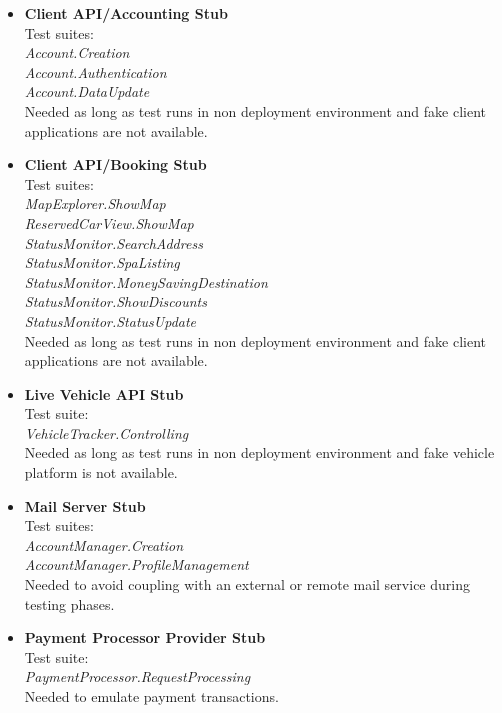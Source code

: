  \begin{itemize}

    \item \textbf{Client API/Accounting Stub}\\
        Test suites:\\\textit{Account.Creation\\
Account.Authentication\\Account.DataUpdate\\}
        Needed as long as test runs in non deployment environment and fake client applications are not available.
    \item \textbf{Client API/Booking Stub}\\
        Test suites:\\\textit{MapExplorer.ShowMap\\ReservedCarView.ShowMap\\StatusMonitor.SearchAddress\\StatusMonitor.SpaListing\\StatusMonitor.MoneySavingDestination\\StatusMonitor.ShowDiscounts\\StatusMonitor.StatusUpdate\\}
        Needed as long as test runs in non deployment environment and fake client applications are not available.
    \item \textbf{Live Vehicle API Stub}\\
        Test suite:\\\textit{VehicleTracker.Controlling\\}
        Needed as long as test runs in non deployment environment and fake vehicle platform is not available.
    \item \textbf{Mail Server Stub}\\
        Test suites:\\\textit{AccountManager.Creation\\AccountManager.ProfileManagement\\}
        Needed to avoid coupling with an external or remote mail service during testing phases.
    \item \textbf{Payment Processor Provider Stub}\\
        Test suite:\\\textit{PaymentProcessor.RequestProcessing\\}
        Needed to emulate payment transactions. 
\end{itemize}


